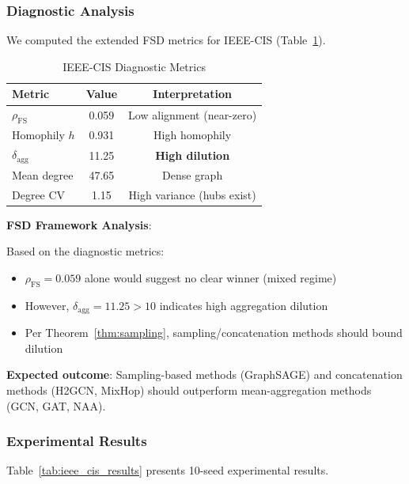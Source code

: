 \subsubsection{Diagnostic Analysis}

We computed the extended FSD metrics for IEEE-CIS (Table~\ref{tab:ieee_cis_diagnostics}).

\begin{table}[t]
\centering
\caption{IEEE-CIS Diagnostic Metrics}
\label{tab:ieee_cis_diagnostics}
\small
\begin{tabular}{lcc}
\toprule
\textbf{Metric} & \textbf{Value} & \textbf{Interpretation} \\
\midrule
$\rho_{\text{FS}}$ & 0.059 & Low alignment (near-zero) \\
Homophily $h$ & 0.931 & High homophily \\
$\delta_{\text{agg}}$ & 11.25 & \textbf{High dilution} \\
Mean degree & 47.65 & Dense graph \\
Degree CV & 1.15 & High variance (hubs exist) \\
\bottomrule
\end{tabular}
\end{table}

\textbf{FSD Framework Analysis}:

Based on the diagnostic metrics:
\begin{itemize}
\item $\rho_{\text{FS}} = 0.059$ alone would suggest no clear winner (mixed regime)
\item However, $\delta_{\text{agg}} = 11.25 > 10$ indicates high aggregation dilution
\item Per Theorem~\ref{thm:sampling}, sampling/concatenation methods should bound dilution
\end{itemize}

\textbf{Expected outcome}: Sampling-based methods (GraphSAGE) and concatenation methods (H2GCN, MixHop) should outperform mean-aggregation methods (GCN, GAT, NAA).

\subsubsection{Experimental Results}

Table~\ref{tab:ieee_cis_results} presents 10-seed experimental results.


